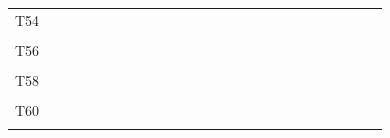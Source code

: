 \documentclass[
]{article}
\begin{document}
\begin{longtable}[l]{lllllllllllllllllllllllll}
T54 &  &  &  &  &  &  &  &  &  &  &  &  &  &  &  &  &  &  &  &  &  &  &  & \\
\cellcolor{gray!6}{T55} & \cellcolor{gray!6}{} & \cellcolor{gray!6}{} & \cellcolor{gray!6}{} & \cellcolor{gray!6}{} & \cellcolor{gray!6}{} & \cellcolor{gray!6}{} & \cellcolor{gray!6}{} & \cellcolor{gray!6}{} & \cellcolor{gray!6}{} & \cellcolor{gray!6}{} & \cellcolor{gray!6}{} & \cellcolor{gray!6}{} & \cellcolor{gray!6}{} & \cellcolor{gray!6}{} & \cellcolor{gray!6}{} & \cellcolor{gray!6}{} & \cellcolor{gray!6}{} & \cellcolor{gray!6}{} & \cellcolor{gray!6}{} & \cellcolor{gray!6}{} & \cellcolor{gray!6}{} & \cellcolor{gray!6}{} & \cellcolor{gray!6}{} & \cellcolor{gray!6}{}\\
\addlinespace
T56 &  &  &  &  &  &  &  &  &  &  &  &  &  &  &  &  &  &  &  &  &  &  &  & \\
\cellcolor{gray!6}{T57} & \cellcolor{gray!6}{} & \cellcolor{gray!6}{} & \cellcolor{gray!6}{} & \cellcolor{gray!6}{} & \cellcolor{gray!6}{} & \cellcolor{gray!6}{} & \cellcolor{gray!6}{} & \cellcolor{gray!6}{} & \cellcolor{gray!6}{} & \cellcolor{gray!6}{} & \cellcolor{gray!6}{} & \cellcolor{gray!6}{} & \cellcolor{gray!6}{} & \cellcolor{gray!6}{} & \cellcolor{gray!6}{} & \cellcolor{gray!6}{} & \cellcolor{gray!6}{} & \cellcolor{gray!6}{} & \cellcolor{gray!6}{} & \cellcolor{gray!6}{} & \cellcolor{gray!6}{} & \cellcolor{gray!6}{} & \cellcolor{gray!6}{} & \cellcolor{gray!6}{}\\
T58 &  &  &  &  &  &  &  &  &  &  &  &  &  &  &  &  &  &  &  &  &  &  &  & \\
\cellcolor{gray!6}{T59} & \cellcolor{gray!6}{} & \cellcolor{gray!6}{} & \cellcolor{gray!6}{} & \cellcolor{gray!6}{} & \cellcolor{gray!6}{} & \cellcolor{gray!6}{} & \cellcolor{gray!6}{} & \cellcolor{gray!6}{} & \cellcolor{gray!6}{} & \cellcolor{gray!6}{} & \cellcolor{gray!6}{} & \cellcolor{gray!6}{} & \cellcolor{gray!6}{} & \cellcolor{gray!6}{} & \cellcolor{gray!6}{} & \cellcolor{gray!6}{} & \cellcolor{gray!6}{} & \cellcolor{gray!6}{} & \cellcolor{gray!6}{} & \cellcolor{gray!6}{} & \cellcolor{gray!6}{} & \cellcolor{gray!6}{} & \cellcolor{gray!6}{} & \cellcolor{gray!6}{}\\
T60 &  &  &  &  &  &  &  &  &  &  &  &  &  &  &  &  &  &  &  &  &  &  &  & \\
\addlinespace
\cellcolor{gray!6}{T61} & \cellcolor{gray!6}{} & \cellcolor{gray!6}{} & \cellcolor{gray!6}{} & \cellcolor{gray!6}{} & \cellcolor{gray!6}{} & \cellcolor{gray!6}{} & \cellcolor{gray!6}{} & \cellcolor{gray!6}{} & \cellcolor{gray!6}{} & \cellcolor{gray!6}{} & \cellcolor{gray!6}{} & \cellcolor{gray!6}{} & \cellcolor{gray!6}{} & \cellcolor{gray!6}{} & \cellcolor{gray!6}{} & \cellcolor{gray!6}{} & \cellcolor{gray!6}{} & \cellcolor{gray!6}{} & \cellcolor{gray!6}{} & \cellcolor{gray!6}{} & \cellcolor{gray!6}{} & \cellcolor{gray!6}{} & \cellcolor{gray!6}{} & \cellcolor{gray!6}{}\\*
\end{longtable}
\end{document}
